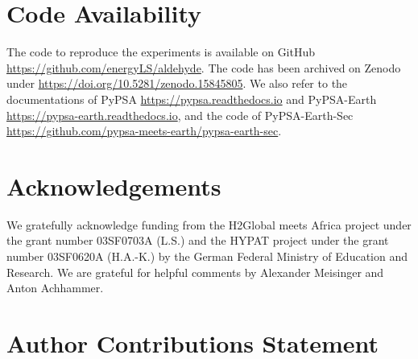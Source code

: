\documentclass[5p,numafflabel]{elsarticle}
\begin{document}
\section*{Code Availability}
The code to reproduce the experiments is available on GitHub \href{https://github.com/energyLS/aldehyde}{https://github.com/energyLS/aldehyde}.
The code has been archived on Zenodo under \href{https://doi.org/10.5281/zenodo.15845805}{https://doi.org/10.5281/zenodo.15845805}\cite{schumm2025}.
We also refer to the documentations of PyPSA \href{https://pypsa.readthedocs.io}{https://pypsa.readthedocs.io} and PyPSA-Earth \href{https://pypsa-earth.readthedocs.io}{https://pypsa-earth.readthedocs.io}, and the code of PyPSA-Earth-Sec
\href{https://github.com/pypsa-meets-earth/pypsa-earth-sec}{https://github.com/pypsa-meets-earth/pypsa-earth-sec}.



\renewcommand{\ttdefault}{\sfdefault}



\section*{Acknowledgements}

We gratefully acknowledge funding from the H2Global meets Africa project under the grant number 03SF0703A (L.S.) and 
the HYPAT project under the grant number 03SF0620A (H.A.-K.) by the German Federal Ministry of Education and Research. We are grateful for helpful comments by Alexander Meisinger and Anton Achhammer.


\section*{Author Contributions Statement}

\end{document}
